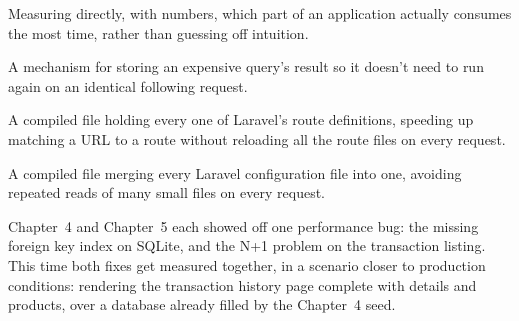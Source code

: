 \begin{istilahpenting}
\begin{description}[leftmargin=0pt,style=nextline]
  \item[Profiling] Measuring directly, with numbers, which part of an application actually consumes the most time, rather than guessing off intuition.
  \item[Query Cache] A mechanism for storing an expensive query's result so it doesn't need to run again on an identical following request.
  \item[Route Cache] A compiled file holding every one of Laravel's route definitions, speeding up matching a URL to a route without reloading all the route files on every request.
  \item[Config Cache] A compiled file merging every Laravel configuration file into one, avoiding repeated reads of many small files on every request.
\end{description}
\end{istilahpenting}

Chapter~4 and Chapter~5 each showed off one performance bug: the
missing foreign key index on SQLite, and the N+1 problem on the
transaction listing. This time both fixes get measured together, in a
scenario closer to production conditions: rendering the transaction
history page complete with details and products, over a database
already filled by the Chapter~4 seed.

